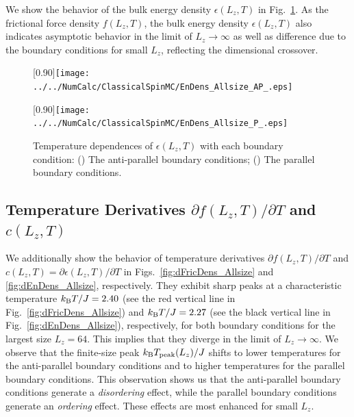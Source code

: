 We show the behavior of the bulk energy density $\epsilon(L_{z}, T)$ in Fig.~\ref{fig:EnDens_Allsize}. As the frictional force density $f(L_{z}, T)$, the bulk energy density $\epsilon(L_{z}, T)$ also indicates asymptotic behavior in the limit of $L_{z}\to\infty$ as well as difference due to the boundary conditions for small $L_{z}$, reflecting the dimensional crossover.

\begin{figure}[htbp]
	\centering
	\subcaptionbox{\label{fig:EnDens_Allsize_AP}}[0.90\linewidth]{\texttt{[image: ../../NumCalc/ClassicalSpinMC/EnDens\_Allsize\_AP\_.eps]}}
	
	\subcaptionbox{\label{fig:EnDens_Allsize_P}}[0.90\linewidth]{\texttt{[image: ../../NumCalc/ClassicalSpinMC/EnDens\_Allsize\_P\_.eps]}}
	
	\caption{Temperature dependences of $\epsilon(L_{z}, T)$ with each boundary condition: () The anti-parallel boundary conditions; () The parallel boundary conditions.}
	\label{fig:EnDens_Allsize}
\end{figure}


\subsection{Temperature Derivatives $\partial f(L_{z}, T)/\partial T$ and $c(L_{z}, T)$}

We additionally show the behavior of temperature derivatives $\partial f(L_{z}, T)/\partial T$ and $c(L_{z},T)=\partial \epsilon(L_{z}, T)/\partial T$ in Figs.~\ref{fig:dFricDens_Allsize} and \ref{fig:dEnDens_Allsize}, respectively. They exhibit sharp peaks at a characteristic temperature $k_{\rm B}T/J=2.40$ (see the red vertical line in Fig.~\ref{fig:dFricDens_Allsize}) and $k_{\rm B}T/J=2.27$ (see the black vertical line in Fig.~\ref{fig:dEnDens_Allsize}), respectively, for both boundary conditions for the largest size $L_{z}=64$. This implies that they diverge in the limit of $L_{z}\to\infty$. We observe that the finite-size peak $k_{\rm B}T_{\rm peak}(L_{z})/J$ shifts to lower temperatures for the anti-parallel boundary conditions and to higher temperatures for the parallel boundary conditions. This observation shows us that the anti-parallel boundary conditions generate a \textit{disordering} effect, while the parallel boundary conditions generate an \textit{ordering} effect. These effects are most enhanced for small $L_{z}$.

